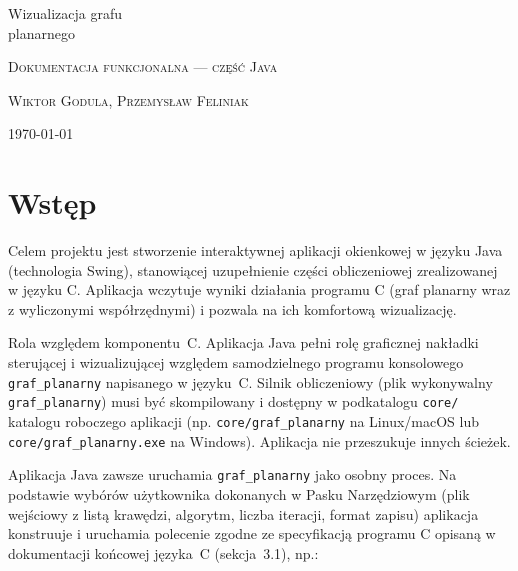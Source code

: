\documentclass[a4paper, 11pt]{article}
\begin{document}
\begin{titlepage}
  \centering
  \vspace*{4cm}

  {\fontsize{32}{38}\selectfont Wizualizacja grafu\\planarnego}

  \vspace{0.8cm}

  {\large\scshape\color{rulegray} Dokumentacja funkcjonalna --- cz\k{e}\'s\'c Java}

  \vspace{1.2cm}

  {\small\scshape Wiktor Godula, Przemys\l{}aw Feliniak}

  \vfill

  {\small\color{rulegray} \today}

\end{titlepage}

\tableofcontents
\newpage

\section{Wst\k{e}p}

Celem projektu jest stworzenie interaktywnej aplikacji okienkowej w j\k{e}zyku Java (technologia Swing), stanowi\k{a}cej uzupe\l{}nienie cz\k{e}\'sci obliczeniowej zrealizowanej w j\k{e}zyku C. Aplikacja wczytuje wyniki dzia\l{}ania programu C (graf planarny wraz z wyliczonymi wsp\'o\l{}rz\k{e}dnymi) i pozwala na ich komfortow\k{a} wizualizacj\k{e}.

Rola wzgl\k{e}dem komponentu~C.
Aplikacja Java pe\l{}ni rol\k{e} graficznej nakładki steruj\k{a}cej i wizualizuj\k{a}cej wzgl\k{e}dem samodzielnego programu konsolowego \texttt{graf\_planarny} napisanego w j\k{e}zyku~C. Silnik obliczeniowy (plik wykonywalny \texttt{graf\_planarny}) musi by\'c skompilowany i dost\k{e}pny w podkatalogu \texttt{core/} katalogu roboczego aplikacji (np. \texttt{core/graf\_planarny} na Linux/macOS lub \texttt{core/graf\_planarny.exe} na Windows). Aplikacja nie przeszukuje innych ścieżek.

Aplikacja Java zawsze uruchamia \texttt{graf\_planarny} jako osobny proces. Na podstawie wyb\'or\'ow u\.zytkownika dokonanych w Pasku Narz\k{e}dziowym (plik wej\'sciowy z list\k{a} kraw\k{e}dzi, algorytm, liczba iteracji, format zapisu) aplikacja konstruuje i uruchamia polecenie zgodne ze specyfikacj\k{a} programu C opisan\k{a} w dokumentacji ko\'ncowej j\k{e}zyka~C (sekcja~3.1), np.:
\end{document}
